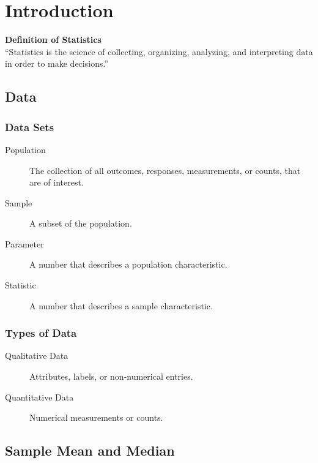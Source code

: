 \documentclass{book}
\begin{document}
\tableofcontents

\chapter{Introduction}
\begin{center}
\textbf{Definition of Statistics}\\
\enquote{Statistics is the science of collecting, organizing, analyzing, and interpreting data in order to make decisions.}
\end{center}

\section{Data}

\subsection{Data Sets}
\begin{description}
\item[Population] The collection of all outcomes, responses, measurements, or counts, that are of interest.

\item[Sample] A subset of the population.

\item[Parameter] A number that describes a population characteristic.

\item[Statistic] A number that describes a sample characteristic.
\end{description}

\subsection{Types of Data}

\begin{description}
\item[Qualitative Data] Attributes, labels, or non-numerical entries.

\item[Quantitative Data] Numerical measurements or counts.
\end{description}

\section{Sample Mean and Median}
\end{document}
